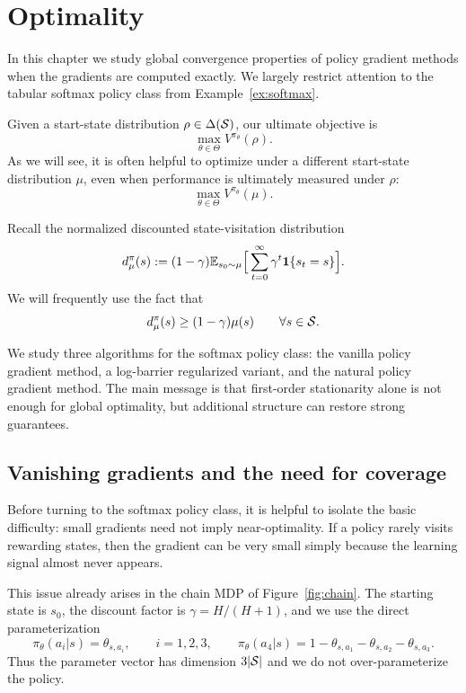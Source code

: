 \chapter{Optimality}

In this chapter we study global convergence properties of policy gradient methods when
the gradients are computed exactly. We largely restrict attention to the tabular softmax
policy class from Example~\ref{ex:softmax}.

Given a start-state distribution $\rho\in \Delta(\mathcal{S})$, our ultimate objective is
\[
\max_{\theta\in\Theta} V^{\pi_\theta}(\rho).
\]
As we will see, it is often helpful to optimize under a different start-state distribution
$\mu$, even when performance is ultimately measured under $\rho$:
\[
\max_{\theta\in\Theta} V^{\pi_\theta}(\mu).
\]

Recall the normalized discounted state-visitation distribution
\[
d_\mu^\pi(s)
:=
(1-\gamma)\mathbb{E}_{s_0\sim\mu}\Big[\sum_{t=0}^\infty \gamma^t \mathbf{1}\{s_t=s\}\Big].
\]
We will frequently use the fact that
\begin{equation}\label{eq:dpi_lb_mu}
d_\mu^\pi(s)\ge (1-\gamma)\mu(s)
\qquad \forall s\in\mathcal{S}.
\end{equation}

We study three algorithms for the softmax policy class:
the vanilla policy gradient method, a log-barrier regularized variant,
and the natural policy gradient method. The main message is that
first-order stationarity alone is not enough for global optimality,
but additional structure can restore strong guarantees.



\section{Vanishing gradients and the need for coverage}
\label{sec:vanishing-gradients}

Before turning to the softmax policy class, it is helpful to isolate the basic difficulty:
small gradients need not imply near-optimality. If a policy rarely visits rewarding states,
then the gradient can be very small simply because the learning signal almost never appears.

This issue already arises in the chain MDP of Figure~\ref{fig:chain}. The starting state is
$s_0$, the discount factor is $\gamma = H/(H+1)$, and we use the direct parameterization
\[
\pi_\theta(a_i|s)=\theta_{s,a_i},\qquad i=1,2,3,
\qquad
\pi_\theta(a_4|s)=1-\theta_{s,a_1}-\theta_{s,a_2}-\theta_{s,a_3}.
\]
Thus the parameter vector has dimension $3|\mathcal{S}|$ and we do not over-parameterize the policy.

